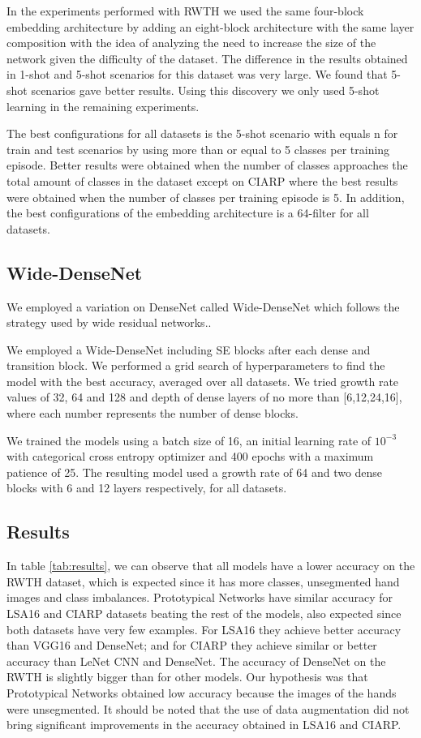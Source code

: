 In the experiments performed with RWTH we used the same four-block embedding architecture by adding an eight-block architecture with the same layer composition with the idea of analyzing the need to increase the size of the network given the difficulty of the dataset. The difference in the results obtained in 1-shot and 5-shot scenarios for this dataset was very large. We found that 5-shot scenarios gave better results. Using this discovery we only used 5-shot learning in the remaining experiments.

The best configurations for all datasets is the 5-shot scenario with equals n for train and test scenarios by using more than or equal to 5 classes per training episode. Better results were obtained when the number of classes approaches the total amount of classes in the dataset except on CIARP where the best results were obtained when the number of classes per training episode is 5. In addition, the best configurations of the embedding architecture is a 64-filter for all datasets.

\subsection{Wide-DenseNet}

We employed a variation on DenseNet called Wide-DenseNet which follows the strategy used by wide residual networks.\cite{He2015DeepRL}.

We employed a Wide-DenseNet including SE blocks after each dense and transition block. We performed a grid search of hyperparameters to find the model with the best accuracy, averaged over all datasets. We tried growth rate values of 32, 64 and 128 and depth of dense layers of no more than [6,12,24,16], where each number represents the number of dense blocks.

We trained the models using a batch size of 16, an initial learning rate of $10^{-3}$ with categorical cross entropy optimizer and 400 epochs with a maximum patience of 25. The resulting model used a growth rate of 64 and two dense blocks with 6 and 12 layers respectively,  for all datasets.

\subsection{Results}

In table \ref{tab:results}, we can observe that all models have a lower accuracy on the RWTH dataset, which is expected since it has more classes, unsegmented hand images and class imbalances. Prototypical Networks have similar accuracy for LSA16 and CIARP datasets beating the rest of the models, also expected since both datasets have very few examples. For LSA16 they achieve better accuracy than VGG16 and DenseNet; and for CIARP they achieve similar or better accuracy than LeNet CNN and DenseNet. The accuracy of DenseNet on the RWTH is slightly bigger than for other models. Our hypothesis was that Prototypical Networks obtained low accuracy because the images of the hands were unsegmented. It should be noted that the use of data augmentation did not bring significant improvements in the accuracy obtained in LSA16 and CIARP.

